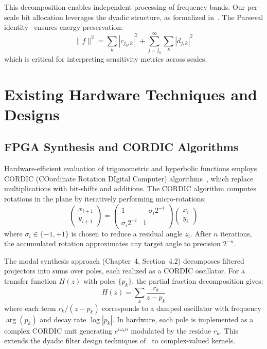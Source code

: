 This decomposition enables independent processing of frequency bands. Our per-scale bit allocation leverages the dyadic structure, as formalized in~\cite{VetterliKovacevic1995}. The Parseval identity~\cite{Walter1992} ensures energy preservation:
\[
\|f\|^2 = \sum_k |c_{j_0,k}|^2 + \sum_{j=j_0}^\infty \sum_k |d_{j,k}|^2
\]
which is critical for interpreting sensitivity metrics across scales.

\section{Existing Hardware Techniques and Designs}

\subsection{FPGA Synthesis and CORDIC Algorithms}

Hardware-efficient evaluation of trigonometric and hyperbolic functions employs CORDIC (COordinate Rotation DIgital Computer) algorithms~\cite{Volder1959,Andraka1998}, which replace multiplications with bit-shifts and additions. The CORDIC algorithm computes rotations in the plane by iteratively performing micro-rotations:
\[
\begin{pmatrix} x_{i+1} \\ y_{i+1} \end{pmatrix} = \begin{pmatrix} 1 & -\sigma_i 2^{-i} \\ \sigma_i 2^{-i} & 1 \end{pmatrix} \begin{pmatrix} x_i \\ y_i \end{pmatrix}
\]
where $\sigma_i \in \{-1, +1\}$ is chosen to reduce a residual angle $z_i$. After $n$ iterations, the accumulated rotation approximates any target angle to precision $2^{-n}$.

The modal synthesis approach (Chapter~4, Section~4.2) decomposes filtered projectors into sums over poles, each realized as a CORDIC oscillator. For a transfer function $H(z)$ with poles $\{p_k\}$, the partial fraction decomposition gives:
\[
H(z) = \sum_k \frac{r_k}{z - p_k}
\]
where each term $r_k/(z - p_k)$ corresponds to a damped oscillator with frequency $\arg(p_k)$ and decay rate $\log|p_k|$. In hardware, each pole is implemented as a complex CORDIC unit generating $e^{i\omega_k n}$ modulated by the residue $r_k$. This extends the dyadic filter design techniques of~\cite{ParkhiUnbehauen1974} to complex-valued kernels.

